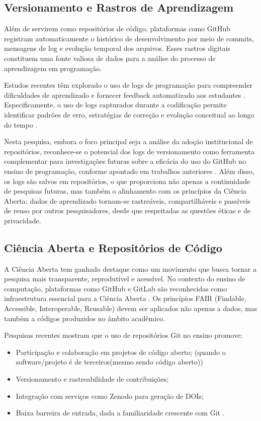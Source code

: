 \documentclass[english, spanish, brazilian]{RBIEarticle}
\begin{document}
\subsection{Versionamento e Rastros de Aprendizagem}

Além de servirem como repositórios de código, plataformas como GitHub registram automaticamente o histórico de desenvolvimento por meio de commits, mensagens de log e evolução temporal dos arquivos. Esses rastros digitais constituem uma fonte valiosa de dados para a análise do processo de aprendizagem em programação.

Estudos recentes têm explorado o uso de logs de programação para compreender dificuldades de aprendizado e fornecer feedback automatizado aos estudantes \cite{qian2017, nascimento2026logs}. Especificamente, o uso de logs capturados durante a codificação permite identificar padrões de erro, estratégias de correção e evolução conceitual ao longo do tempo \cite{nascimento2026logs}.

Nesta pesquisa, embora o foco principal seja a análise da adoção institucional de repositórios, reconhece-se o potencial dos logs de versionamento como ferramenta complementar para investigações futuras sobre a eficácia do uso do GitHub no ensino de programação, conforme apontado em trabalhos anteriores \cite{nascimento2026logs}. Além disso, os logs são salvos em repositórios, o que proporciona não apenas a continuidade de pesquisas futuras, mas também o alinhamento com os princípios da Ciência Aberta: dados de aprendizado tornam-se rastreáveis, compartilháveis e passíveis de reuso por outros pesquisadores, desde que respeitadas as questões éticas e de privacidade.

\subsection{Ciência Aberta e Repositórios de Código}

A Ciência Aberta tem ganhado destaque como um movimento que busca tornar a pesquisa mais transparente, reprodutível e acessível. No contexto do ensino de computação, plataformas como GitHub e GitLab são reconhecidas como infraestrutura essencial para a Ciência Aberta \cite{momcheva2025}. Os princípios FAIR (Findable, Accessible, Interoperable, Reusable) devem ser aplicados não apenas a dados, mas também a códigos produzidos no âmbito acadêmico.

Pesquisas recentes mostram que o uso de repositórios Git no ensino promove:
\begin{itemize}
\item Participação e colaboração em projetos de código aberto; (quando o software/projeto é de terceiros(mesmo sendo código aberto))
\item Versionamento e rastreabilidade de contribuições;
\item Integração com serviços como Zenodo para geração de DOIs;
\item Baixa barreira de entrada, dada a familiaridade crescente com Git \cite{vanGeest2024}.
\end{itemize}
\end{document}
